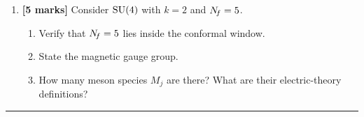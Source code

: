 \documentclass[11pt,a4paper]{article}
\begin{document}
\begin{enumerate}[label=(\alph*)]
  \item \textbf{[5 marks]}
    Consider $\mathrm{SU}(4)$ with $k = 2$ and $N_{\!f} = 5$.
    \begin{enumerate}[label=(\roman*)]
      \item Verify that $N_{\!f} = 5$ lies inside the conformal window.
      \item State the magnetic gauge group.
      \item How many meson species $M_j$ are there?  What are their
        electric-theory definitions?
    \end{enumerate}

\end{enumerate}

\bigskip
\hrule
\bigskip


\end{document}
